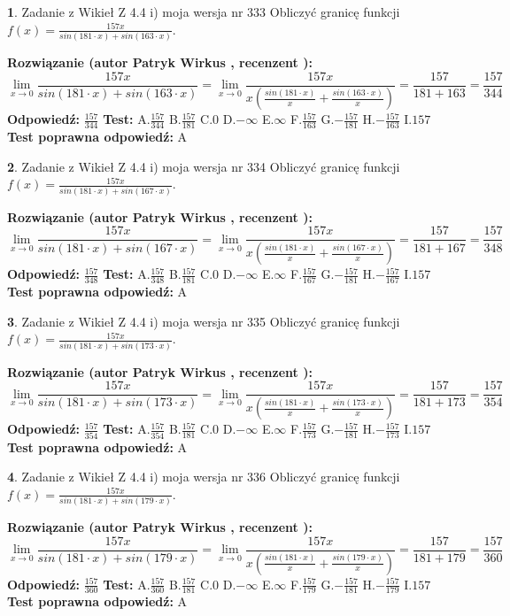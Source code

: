 \documentclass[12pt, a4paper]{article}
\theoremstyle{definition} %
\newtheorem{zad}{}
\newcommand{\zadStart}[1]{\begin{zad}#1\newline}
\newcommand{\zadStop}{\end{zad}}
\newcommand{\rozwStart}[2]{\noindent \textbf{Rozwiązanie (autor #1 , recenzent #2): }\newline}
\newcommand{\rozwStop}{\newline}
\newcommand{\odpStart}{\noindent \textbf{Odpowiedź:}\newline}
\newcommand{\odpStop}{\newline}
\newcommand{\testStart}{\noindent \textbf{Test:}\newline}
\newcommand{\testStop}{\newline}
\newcommand{\kluczStart}{\noindent \textbf{Test poprawna odpowiedź:}\newline}
\newcommand{\kluczStop}{\newline}
\begin{document}
\zadStart{Zadanie z Wikieł Z 4.4 i) moja wersja nr 333}
Obliczyć granicę funkcji $f(x)=\frac{157x}{sin(181\cdot x) +sin(163\cdot x)}$.
\zadStop
\rozwStart{Patryk Wirkus}{}
$$\lim\limits_{x\to 0}\frac{157x}{sin(181\cdot x) +sin(163\cdot x)}=\lim\limits_{x\to 0}\frac{157x}{x(\frac{sin(181\cdot x)}{x}+\frac{sin(163\cdot x)}{x})}=\frac{157}{181+163} = \frac{157}{344}$$
\rozwStop
\odpStart
$\frac{157}{344}$
\odpStop
\testStart
A.$\frac{157}{344}$
B.$\frac{157}{181}$
C.$0$
D.$-\infty$
E.$\infty$
F.$\frac{157}{163}$
G.$-\frac{157}{181}$
H.$-\frac{157}{163}$
I.$157$
\testStop
\kluczStart
A
\kluczStop



\zadStart{Zadanie z Wikieł Z 4.4 i) moja wersja nr 334}
Obliczyć granicę funkcji $f(x)=\frac{157x}{sin(181\cdot x) +sin(167\cdot x)}$.
\zadStop
\rozwStart{Patryk Wirkus}{}
$$\lim\limits_{x\to 0}\frac{157x}{sin(181\cdot x) +sin(167\cdot x)}=\lim\limits_{x\to 0}\frac{157x}{x(\frac{sin(181\cdot x)}{x}+\frac{sin(167\cdot x)}{x})}=\frac{157}{181+167} = \frac{157}{348}$$
\rozwStop
\odpStart
$\frac{157}{348}$
\odpStop
\testStart
A.$\frac{157}{348}$
B.$\frac{157}{181}$
C.$0$
D.$-\infty$
E.$\infty$
F.$\frac{157}{167}$
G.$-\frac{157}{181}$
H.$-\frac{157}{167}$
I.$157$
\testStop
\kluczStart
A
\kluczStop



\zadStart{Zadanie z Wikieł Z 4.4 i) moja wersja nr 335}
Obliczyć granicę funkcji $f(x)=\frac{157x}{sin(181\cdot x) +sin(173\cdot x)}$.
\zadStop
\rozwStart{Patryk Wirkus}{}
$$\lim\limits_{x\to 0}\frac{157x}{sin(181\cdot x) +sin(173\cdot x)}=\lim\limits_{x\to 0}\frac{157x}{x(\frac{sin(181\cdot x)}{x}+\frac{sin(173\cdot x)}{x})}=\frac{157}{181+173} = \frac{157}{354}$$
\rozwStop
\odpStart
$\frac{157}{354}$
\odpStop
\testStart
A.$\frac{157}{354}$
B.$\frac{157}{181}$
C.$0$
D.$-\infty$
E.$\infty$
F.$\frac{157}{173}$
G.$-\frac{157}{181}$
H.$-\frac{157}{173}$
I.$157$
\testStop
\kluczStart
A
\kluczStop



\zadStart{Zadanie z Wikieł Z 4.4 i) moja wersja nr 336}
Obliczyć granicę funkcji $f(x)=\frac{157x}{sin(181\cdot x) +sin(179\cdot x)}$.
\zadStop
\rozwStart{Patryk Wirkus}{}
$$\lim\limits_{x\to 0}\frac{157x}{sin(181\cdot x) +sin(179\cdot x)}=\lim\limits_{x\to 0}\frac{157x}{x(\frac{sin(181\cdot x)}{x}+\frac{sin(179\cdot x)}{x})}=\frac{157}{181+179} = \frac{157}{360}$$
\rozwStop
\odpStart
$\frac{157}{360}$
\odpStop
\testStart
A.$\frac{157}{360}$
B.$\frac{157}{181}$
C.$0$
D.$-\infty$
E.$\infty$
F.$\frac{157}{179}$
G.$-\frac{157}{181}$
H.$-\frac{157}{179}$
I.$157$
\testStop
\kluczStart
A
\kluczStop
\end{document}
